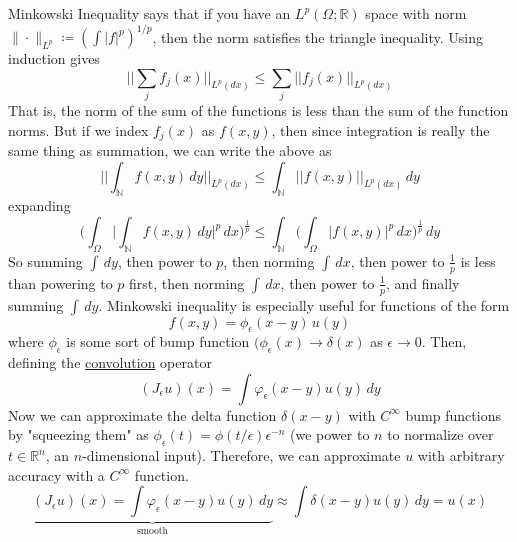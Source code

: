 	Minkowski Inequality says that if you have an $L^p(\Omega; \mathbb{R})$ space with norm $\| \cdot \|_{L^p} \coloneqq ( \int |f|^p )^{1/p}$, then the norm satisfies the triangle inequality. Using induction gives
	\begin{equation}
	  \bigg| \bigg| \sum_j f_j (x) \bigg| \bigg|_{L^p (dx)} \leq \sum_j \big| \big| f_j (x) \big| \big|_{L^p (dx)}
	\end{equation}
	That is, the norm of the sum of the functions is less than the sum of the function norms. But if we index $f_j (x)$ as $f(x, y)$, then since integration is really the same thing as summation, we can write the above as 
	\begin{equation}
	  \bigg| \bigg| \int_{\mathbb{N}} f(x, y) \,dy \bigg| \bigg|_{L^p (dx)} \leq \int_\mathbb{N} \big| \big| f(x, y) \big| \big|_{L^p (dx)} \,dy
	\end{equation}
	expanding 
	\begin{equation}
	  \bigg( \int_\Omega \bigg| \int_{\mathbb{N}} f(x, y) \,dy \bigg|^p \, dx \bigg)^{\frac{1}{p}} \leq \int_\mathbb{N} \bigg( \int_\Omega \big| f(x, y) \big|^{p} \,dx \bigg)^{\frac{1}{p}} \, dy
	\end{equation}
	So summing $\int\,dy$, then power to $p$, then norming $\int\,dx$, then power to $\frac{1}{p}$ is less than powering to $p$ first, then norming $\int\,dx$, then power to $\frac{1}{p}$, and finally summing $\int \, dy$. Minkowski inequality is especially useful for functions of the form 
	\begin{equation}
	  f(x, y) = \phi_\epsilon (x - y) \, u(y)
	\end{equation}
	where $\phi_\epsilon$ is some sort of bump function $(\phi_\epsilon (x) \rightarrow \delta (x)$ as $\epsilon \rightarrow 0$. Then, defining the \hyperref[real-thm:convolution]{convolution} operator 
	\begin{equation}
	  (J_\epsilon u) (x) = \int \varphi_\epsilon (x - y) u(y)\, dy
	\end{equation}
	Now we can approximate the delta function $\delta (x - y)$ with $C^\infty$ bump functions by "squeezing them" as $\phi_\epsilon (t) = \phi(t / \epsilon) \epsilon^{-n}$ (we power to $n$ to normalize over $t \in \mathbb{R}^n$, an $n$-dimensional input). Therefore, we can approximate $u$ with arbitrary accuracy with a $C^\infty$ function. 
	\begin{equation}
	  \underbrace{(J_\epsilon u) (x) = \int \varphi_\epsilon (x - y) u(y)\, dy}_{\text{smooth}} \approx \int \delta (x - y) u(y) \,dy = u(x)
	\end{equation}
